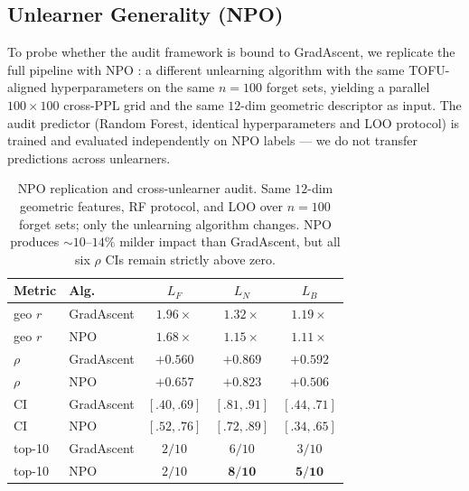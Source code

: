 \documentclass[11pt,a4paper]{article}
\newcommand{\Lforget}{L_F}
\newcommand{\Lneigh}{L_N}
\newcommand{\Lbyst}{L_B}
\begin{document}
\subsection{Unlearner Generality (NPO)}
\label{sec:cross-unlearner}

To probe whether the audit framework is bound to GradAscent, we replicate the
full pipeline with NPO \citep{zhang2024negative}: a different unlearning
algorithm with the same TOFU-aligned hyperparameters on the same $n{=}100$
forget sets, yielding a parallel $100\times100$ cross-PPL grid and the same
$12$-dim geometric descriptor as input. The audit predictor (Random Forest,
identical hyperparameters and LOO protocol) is trained and evaluated
independently on NPO labels — we do not transfer predictions across unlearners.

\begin{table}[t]
\centering
\footnotesize
\setlength{\tabcolsep}{2.1pt}
\begin{tabular}{@{}llccc@{}}
    \toprule
    Metric & Alg. & $\Lforget$ & $\Lneigh$ & $\Lbyst$ \\
    \midrule
    geo $r$
       & GradAscent & $1.96\times$       & $1.32\times$       & $1.19\times$       \\
    geo $r$
       & NPO        & $1.68\times$       & $1.15\times$       & $1.11\times$       \\
    \midrule
    $\rho$
       & GradAscent & $+0.560$           & $\mathbf{+0.869}$  & $+0.592$           \\
    $\rho$
       & NPO        & $\mathbf{+0.657}$  & $+0.823$           & $+0.506$           \\
    \midrule
    CI
       & GradAscent & $[.40,.69]$        & $[.81,.91]$        & $[.44,.71]$        \\
    CI
       & NPO        & $[.52,.76]$        & $[.72,.89]$        & $[.34,.65]$        \\
    \midrule
    top-10
       & GradAscent & $2/10$             & $6/10$             & $3/10$             \\
    top-10
       & NPO        & $2/10$             & $\mathbf{8/10}$    & $\mathbf{5/10}$    \\
    \bottomrule
\end{tabular}
\caption{NPO replication and cross-unlearner audit. Same $12$-dim geometric features, RF protocol, and LOO over $n{=}100$ forget sets; only the unlearning algorithm changes. NPO produces ${\sim}10\text{--}14\%$ milder impact than GradAscent, but all six $\rho$ CIs remain strictly above zero.}
\label{tab:cross-unlearner}
\end{table}
\end{document}

